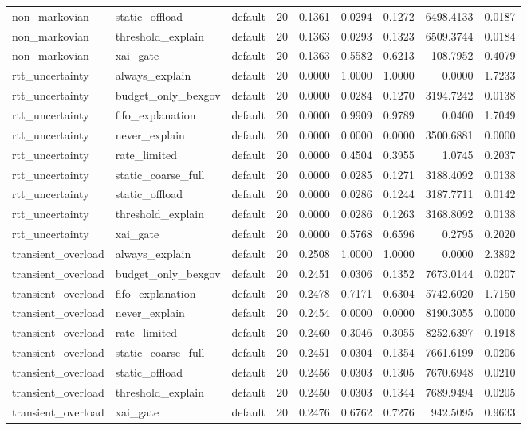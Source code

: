 \begin{table}[t]
\begin{tabular}{lllrrrrrr}
non\_markovian & static\_offload & default & 20 & 0.1361 & 0.0294 & 0.1272 & 6498.4133 & 0.0187 \\
non\_markovian & threshold\_explain & default & 20 & 0.1363 & 0.0293 & 0.1323 & 6509.3744 & 0.0184 \\
non\_markovian & xai\_gate & default & 20 & 0.1363 & 0.5582 & 0.6213 & 108.7952 & 0.4079 \\
rtt\_uncertainty & always\_explain & default & 20 & 0.0000 & 1.0000 & 1.0000 & 0.0000 & 1.7233 \\
rtt\_uncertainty & budget\_only\_bexgov & default & 20 & 0.0000 & 0.0284 & 0.1270 & 3194.7242 & 0.0138 \\
rtt\_uncertainty & fifo\_explanation & default & 20 & 0.0000 & 0.9909 & 0.9789 & 0.0400 & 1.7049 \\
rtt\_uncertainty & never\_explain & default & 20 & 0.0000 & 0.0000 & 0.0000 & 3500.6881 & 0.0000 \\
rtt\_uncertainty & rate\_limited & default & 20 & 0.0000 & 0.4504 & 0.3955 & 1.0745 & 0.2037 \\
rtt\_uncertainty & static\_coarse\_full & default & 20 & 0.0000 & 0.0285 & 0.1271 & 3188.4092 & 0.0138 \\
rtt\_uncertainty & static\_offload & default & 20 & 0.0000 & 0.0286 & 0.1244 & 3187.7711 & 0.0142 \\
rtt\_uncertainty & threshold\_explain & default & 20 & 0.0000 & 0.0286 & 0.1263 & 3168.8092 & 0.0138 \\
rtt\_uncertainty & xai\_gate & default & 20 & 0.0000 & 0.5768 & 0.6596 & 0.2795 & 0.2020 \\
transient\_overload & always\_explain & default & 20 & 0.2508 & 1.0000 & 1.0000 & 0.0000 & 2.3892 \\
transient\_overload & budget\_only\_bexgov & default & 20 & 0.2451 & 0.0306 & 0.1352 & 7673.0144 & 0.0207 \\
transient\_overload & fifo\_explanation & default & 20 & 0.2478 & 0.7171 & 0.6304 & 5742.6020 & 1.7150 \\
transient\_overload & never\_explain & default & 20 & 0.2454 & 0.0000 & 0.0000 & 8190.3055 & 0.0000 \\
transient\_overload & rate\_limited & default & 20 & 0.2460 & 0.3046 & 0.3055 & 8252.6397 & 0.1918 \\
transient\_overload & static\_coarse\_full & default & 20 & 0.2451 & 0.0304 & 0.1354 & 7661.6199 & 0.0206 \\
transient\_overload & static\_offload & default & 20 & 0.2456 & 0.0303 & 0.1305 & 7670.6948 & 0.0210 \\
transient\_overload & threshold\_explain & default & 20 & 0.2450 & 0.0303 & 0.1344 & 7689.9494 & 0.0205 \\
transient\_overload & xai\_gate & default & 20 & 0.2476 & 0.6762 & 0.7276 & 942.5095 & 0.9633 \\
\bottomrule
\end{tabular}
\end{table}
